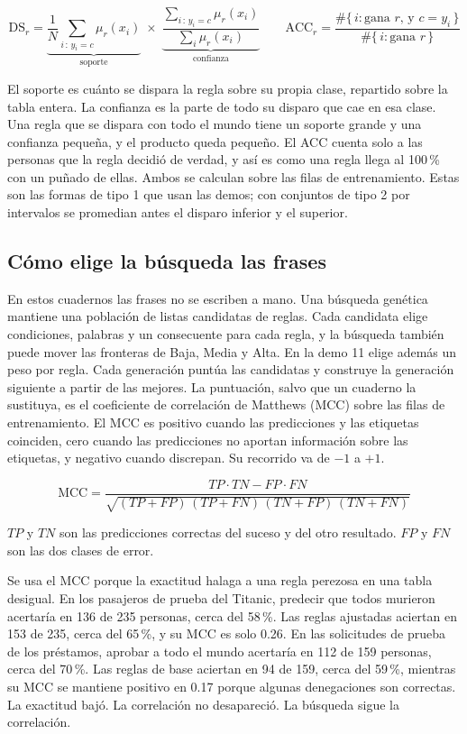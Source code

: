\documentclass[11pt]{article}
\newcommand{\pct}[1]{\mbox{#1\,\%}}
\begin{document}
\[
\mathrm{DS}_r
=
\underbrace{\frac{1}{N}\sum_{i\,:\,y_i = c} \mu_r(x_i)}_{\text{soporte}}
\;\times\;
\underbrace{\frac{\sum_{i\,:\,y_i = c} \mu_r(x_i)}{\sum_{i} \mu_r(x_i)}}_{\text{confianza}}
\qquad
\mathrm{ACC}_r
=
\frac{\#\{\,i : \text{gana } r \text{, y } c = y_i\,\}}{\#\{\,i : \text{gana } r\,\}}
\]

El soporte es cuánto se dispara la regla sobre su propia clase, repartido sobre la tabla entera. La confianza es la parte de todo su disparo que cae en esa clase. Una regla que se dispara con todo el mundo tiene un soporte grande y una confianza pequeña, y el producto queda pequeño. El ACC cuenta solo a las personas que la regla decidió de verdad, y así es como una regla llega al \pct{100} con un puñado de ellas. Ambos se calculan sobre las filas de entrenamiento. Estas son las formas de tipo 1 que usan las demos; con conjuntos de tipo 2 por intervalos se promedian antes el disparo inferior y el superior.

\subsection{Cómo elige la búsqueda las frases}
\label{sec:search}

En estos cuadernos las frases no se escriben a mano. Una búsqueda genética mantiene una población de listas candidatas de reglas. Cada candidata elige condiciones, palabras y un consecuente para cada regla, y la búsqueda también puede mover las fronteras de Baja, Media y Alta. En la demo 11 elige además un peso por regla. Cada generación puntúa las candidatas y construye la generación siguiente a partir de las mejores. La puntuación, salvo que un cuaderno la sustituya, es el coeficiente de correlación de Matthews (MCC) sobre las filas de entrenamiento. El MCC es positivo cuando las predicciones y las etiquetas coinciden, cero cuando las predicciones no aportan información sobre las etiquetas, y negativo cuando discrepan. Su recorrido va de \(-1\) a \(+1\).

\[
\mathrm{MCC}
=
\frac{TP \cdot TN - FP \cdot FN}
{\sqrt{(TP+FP)\,(TP+FN)\,(TN+FP)\,(TN+FN)}}
\]

\(TP\) y \(TN\) son las predicciones correctas del suceso y del otro resultado. \(FP\) y \(FN\) son las dos clases de error.

Se usa el MCC porque la exactitud halaga a una regla perezosa en una tabla desigual. En los pasajeros de prueba del Titanic, predecir que todos murieron acertaría en 136 de 235 personas, cerca del \pct{58}. Las reglas ajustadas aciertan en 153 de 235, cerca del \pct{65}, y su MCC es solo 0.26. En las solicitudes de prueba de los préstamos, aprobar a todo el mundo acertaría en 112 de 159 personas, cerca del \pct{70}. Las reglas de base aciertan en 94 de 159, cerca del \pct{59}, mientras su MCC se mantiene positivo en 0.17 porque algunas denegaciones son correctas. La exactitud bajó. La correlación no desapareció. La búsqueda sigue la correlación.
\end{document}
